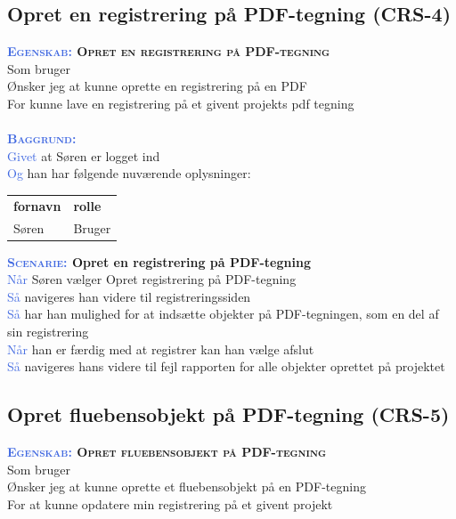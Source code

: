 \subsection{Opret en registrering på PDF-tegning (CRS-4)} \label{sec:USOpretRegPåPDF}
\textbf{\textsc{\textcolor{RoyalBlue}{Egenskab:} Opret en registrering på PDF-tegning}}\\
Som bruger\\
Ønsker jeg at kunne oprette en registrering på en PDF\\
For kunne lave en registrering på et givent projekts pdf tegning \\ \\

\textsc{\textcolor{RoyalBlue}{\textbf{Baggrund:}}}\\
\textcolor{RoyalBlue}{Givet} at Søren er logget ind\\
\textcolor{RoyalBlue}{Og} han har følgende nuværende oplysninger:\\
\begin{tabular}{| l | l |}
	\textbf{fornavn} & \textbf{rolle} \\
	Søren & Bruger\\
\end{tabular}

\textbf{\textsc{\textcolor{RoyalBlue}{Scenarie:}} Opret en registrering på PDF-tegning}\\
\textcolor{RoyalBlue}{Når} Søren vælger Opret registrering på PDF-tegning\\
\textcolor{RoyalBlue}{Så}  navigeres han videre til registreringssiden\\
\textcolor{RoyalBlue}{Så}  har han mulighed for at indsætte objekter på PDF-tegningen, som en del af sin registrering\\
\textcolor{RoyalBlue}{Når} han er færdig med at registrer kan han vælge afslut \\
\textcolor{RoyalBlue}{Så}  navigeres hans videre til fejl rapporten for alle objekter oprettet på projektet \\

\subsection{Opret fluebensobjekt på PDF-tegning (CRS-5)} \label{sec:USOpretFlueben}
\textbf{\textsc{\textcolor{RoyalBlue}{Egenskab:} Opret fluebensobjekt på PDF-tegning}}\\
Som bruger\\
Ønsker jeg at kunne oprette et fluebensobjekt på en PDF-tegning\\
For at kunne opdatere min registrering på et givent projekt \\

